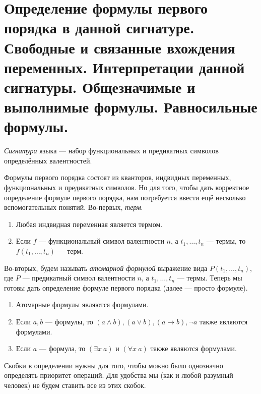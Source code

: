 \documentclass{article}
\begin{document}
\section{Определение формулы первого порядка в данной сигнатуре. Свободные и связанные вхождения переменных. Интерпретации данной сигнатуры. Общезначимые и выполнимые формулы. Равносильные формулы.}
\begin{definition} \textit{Сигнатура} языка --- набор функциональных и предикатных символов определённых валентностей. \end{definition}
Формулы первого порядка состоят из кванторов, индвидных переменных, функциональных и предикатных символов. Но для того, чтобы дать корректное определение формуле первого порядка, нам потребуется ввести ещё несколько вспомогательных понятий. Во-первых, \textit{терм}.
\begin{enumerate}
	\item Любая индвидная переменная является термом.
	\item Если \(f\) --- функциональный символ валентности \(n\), а \(t_1, \ldots, t_n\) --- термы, то \(f(t_1, \ldots, t_n)\) --- терм.
\end{enumerate}
 Во-вторых, будем называть \textit{атомарной формулой} выражение вида \(P(t_1, \ldots, t_n)\), где \(P\) --- предикатный символ валентности \(n\), а \(t_1, \ldots, t_n\) --- термы. Теперь мы готовы дать определение формуле первого порядка (далее --- просто формуле).
\begin{definition}
	\begin{enumerate}
		\item Атомарные формулы являются формулами.
		\item Если \(a, b\) --- формулы, то \((a \land b), (a \lor b), (a \to b), \lnot a\) также являются формулами.
		\item Если \(a\) --- формула, то \((\exists x \  a)\) и \((\forall x \  a)\) также являются формулами.
	\end{enumerate}
\end{definition}
Скобки в определении нужны для того, чтобы можно было однозначно определять приоритет операций. Для удобства мы (как и любой разумный человек) не будем ставить все из этих скобок.
\end{document}
